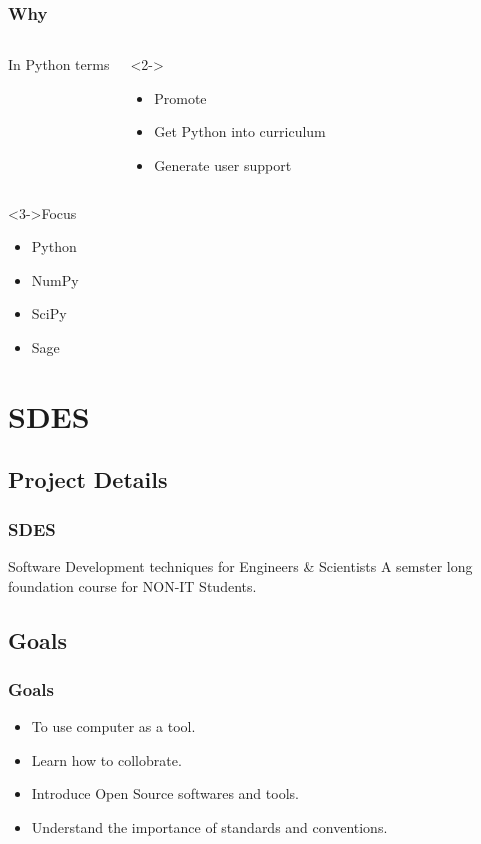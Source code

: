 \documentclass[compress,red]{beamer} %
\begin{document}
\begin{frame}
\frametitle{Why}
\begin{columns}
\begin{exampleblock}{}
In Python terms
\end{exampleblock}
\begin{exampleblock}<2->{}
\begin{itemize}
\item Promote 
\item Get Python into curriculum
\item Generate user support
\end{itemize}
\end{exampleblock}
\end{columns}
\begin{block}<3->{Focus}
\begin{itemize}
\item Python
\item NumPy
\item SciPy
\item Sage
\end{itemize}
\end{block}
\end{frame}



\section{SDES}
\subsection{Project Details}
\begin{frame}
\frametitle{SDES}
\begin{block}{Software Development techniques for Engineers \& Scientists}
A semster long foundation course for NON-IT Students.
\end{block}
\end{frame}

\subsection{Goals}
\begin{frame}
\frametitle{Goals}
\begin{itemize}
\item To use computer as a tool.
\item Learn how to collobrate.
\item Introduce Open Source softwares and tools.
\item Understand the importance of standards and conventions.
\end{itemize}
\end{frame}
\end{document}
